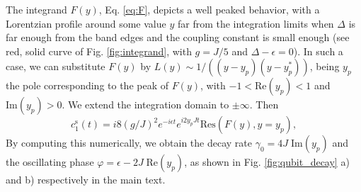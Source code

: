 \documentclass[aps,pra,twocolumn,floatfix,superscriptaddress]{revtex4-1}%
\begin{document}
The integrand $F(y)$, Eq. \eqref{eq:F}, depicts a well peaked behavior, with a Lorentzian profile around some value $y$ far from the integration limits when $\Delta$ is far enough from the band edges and the coupling constant is small enough (see red, solid curve of Fig. \ref{fig:integrand}, with $g=J/5$ and $\Delta-\epsilon=0$). In such a case, we can substitute $F(y)$ by $L(y)\sim 1/((y-y_p)(y-y_p^*))$, being $y_p$ the pole corresponding to the peak of $F(y)$, with $-1<\text{Re}(y_p)<1$ and $\text{Im}(y_p)>0$. We extend the integration domain to $\pm\infty$. Then
\begin{equation}
c_1^\text{s}(t) = i8(g/J)^2 e^{-i\epsilon t}e^{i2y_p Jt}\text{Res}(F(y),y=y_p),
\end{equation}
By computing this numerically, we obtain the decay rate  $\gamma_0 = 4J\;\text{Im}(y_p)$ and the oscillating phase $\varphi = \epsilon - 2J\;\text{Re}(y_p)$, as shown in Fig. \ref{fig:qubit_decay} a) and b) respectively in the main text.

\end{document}
